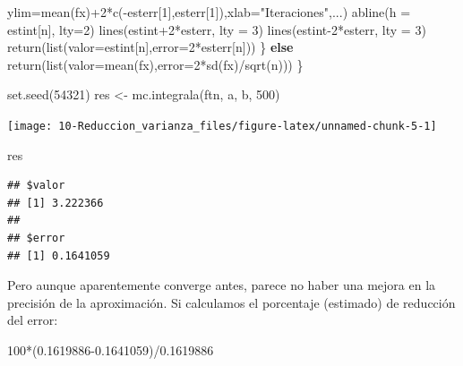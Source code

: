 \documentclass[
]{book}
\newenvironment{Shaded}{\begin{snugshade}}{\end{snugshade}}
\newcommand{\AttributeTok}[1]{\textcolor[rgb]{0.77,0.63,0.00}{#1}}
\newcommand{\ControlFlowTok}[1]{\textcolor[rgb]{0.13,0.29,0.53}{\textbf{#1}}}
\newcommand{\DecValTok}[1]{\textcolor[rgb]{0.00,0.00,0.81}{#1}}
\newcommand{\FloatTok}[1]{\textcolor[rgb]{0.00,0.00,0.81}{#1}}
\newcommand{\FunctionTok}[1]{\textcolor[rgb]{0.00,0.00,0.00}{#1}}
\newcommand{\NormalTok}[1]{#1}
\newcommand{\OtherTok}[1]{\textcolor[rgb]{0.56,0.35,0.01}{#1}}
\newcommand{\SpecialCharTok}[1]{\textcolor[rgb]{0.00,0.00,0.00}{#1}}
\newcommand{\StringTok}[1]{\textcolor[rgb]{0.31,0.60,0.02}{#1}}
\theoremstyle{break}
\theoremstyle{definition}
\theoremstyle{definition}
\theoremstyle{definition}
\theoremstyle{definition}
\theoremstyle{remark}
\begin{document}
\begin{Shaded}
\begin{Highlighting}[]
         \AttributeTok{ylim=}\FunctionTok{mean}\NormalTok{(fx)}\SpecialCharTok{+}\DecValTok{2}\SpecialCharTok{*}\FunctionTok{c}\NormalTok{(}\SpecialCharTok{{-}}\NormalTok{esterr[}\DecValTok{1}\NormalTok{],esterr[}\DecValTok{1}\NormalTok{]),}\AttributeTok{xlab=}\StringTok{"Iteraciones"}\NormalTok{,...)}
    \FunctionTok{abline}\NormalTok{(}\AttributeTok{h =}\NormalTok{ estint[n], }\AttributeTok{lty=}\DecValTok{2}\NormalTok{)}
    \FunctionTok{lines}\NormalTok{(estint}\SpecialCharTok{+}\DecValTok{2}\SpecialCharTok{*}\NormalTok{esterr, }\AttributeTok{lty =} \DecValTok{3}\NormalTok{)}
    \FunctionTok{lines}\NormalTok{(estint}\DecValTok{{-}2}\SpecialCharTok{*}\NormalTok{esterr, }\AttributeTok{lty =} \DecValTok{3}\NormalTok{)}
    \FunctionTok{return}\NormalTok{(}\FunctionTok{list}\NormalTok{(}\AttributeTok{valor=}\NormalTok{estint[n],}\AttributeTok{error=}\DecValTok{2}\SpecialCharTok{*}\NormalTok{esterr[n]))}
\NormalTok{  \} }\ControlFlowTok{else} \FunctionTok{return}\NormalTok{(}\FunctionTok{list}\NormalTok{(}\AttributeTok{valor=}\FunctionTok{mean}\NormalTok{(fx),}\AttributeTok{error=}\DecValTok{2}\SpecialCharTok{*}\FunctionTok{sd}\NormalTok{(fx)}\SpecialCharTok{/}\FunctionTok{sqrt}\NormalTok{(n)))}
\NormalTok{\}}

\FunctionTok{set.seed}\NormalTok{(}\DecValTok{54321}\NormalTok{)}
\NormalTok{res }\OtherTok{\textless{}{-}} \FunctionTok{mc.integrala}\NormalTok{(ftn, a, b, }\DecValTok{500}\NormalTok{)}
\end{Highlighting}
\end{Shaded}

\begin{center}\texttt{[image: 10-Reduccion\_varianza\_files/figure-latex/unnamed-chunk-5-1]} \end{center}

\begin{Shaded}
\begin{Highlighting}[]
\NormalTok{res}
\end{Highlighting}
\end{Shaded}

\begin{verbatim}
## $valor
## [1] 3.222366
## 
## $error
## [1] 0.1641059
\end{verbatim}

Pero aunque aparentemente converge antes, parece no haber una mejora en la precisión de la aproximación.
Si calculamos el porcentaje (estimado) de reducción del error:

\begin{Shaded}
\begin{Highlighting}[]
\DecValTok{100}\SpecialCharTok{*}\NormalTok{(}\FloatTok{0.1619886{-}0.1641059}\NormalTok{)}\SpecialCharTok{/}\FloatTok{0.1619886}
\end{Highlighting}
\end{Shaded}
\end{document}
